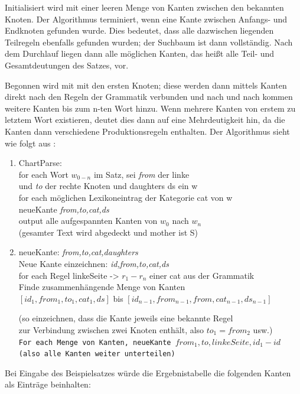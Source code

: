 \documentclass[12pt]{report}
\begin{document}
Initialisiert wird mit einer leeren Menge von Kanten zwischen den bekannten Knoten. Der Algorithmus terminiert, wenn eine Kante zwischen Anfangs- und Endknoten gefunden wurde. Dies bedeutet, dass alle dazwischen liegenden Teilregeln ebenfalls gefunden wurden; der Suchbaum ist dann vollständig. Nach dem Durchlauf liegen dann alle möglichen Kanten, das heißt alle Teil- und Gesamtdeutungen des Satzes, vor. 

Begonnen wird mit mit den ersten Knoten; diese werden dann mittels Kanten direkt nach den Regeln der Grammatik verbunden und nach und nach kommen weitere Kanten bis zum n-ten Wort hinzu. Wenn mehrere Kanten von erstem zu letztem Wort existieren, deutet dies dann auf eine Mehrdeutigkeit hin, da die Kanten dann verschiedene Produktionsregeln enthalten. Der Algorithmus sieht wie folgt aus \cite{cop04}:
\begin{enumerate} \tt
\item 
ChartParse: \\
for each Wort $w_{0-n}$ im Satz, sei \textit{from} der linke \\
und \textit{to} der rechte Knoten und daughters ds ein w \\
\hspace*{.2cm} for each möglichen Lexikoneintrag der Kategorie cat von w \\
\hspace*{.4cm} neueKante \textit{from,to,cat,ds} \\
output alle aufgespannten Kanten von $w_{0}$ nach $w_{n}$ \\ \rm(gesamter Text wird abgedeckt und mother ist S)\tt
\item 
neueKante: \textit{from,to,cat,daughters} \\
Neue Kante einzeichnen: \textit{id,from,to,cat,ds} \\
for each Regel linkeSeite -> $r_{1}-r_{n}$ einer cat aus der Grammatik \\
\hspace*{.2cm} Finde zusammenhängende Menge von Kanten \\
\hspace*{.2cm} $[id_{1},from_{1},to_{1},cat_{1},ds]$ bis $[id_{n-1},from_{n-1},from,cat_{n-1},ds_{n-1}]$ 

\rm(so einzeichnen, dass die Kante jeweils  eine bekannte Regel \\
zur Verbindung zwischen zwei Knoten enthält, also $to_{1}=from_{2}$ usw.)\tt \\
\hspace*{.2cm} For each Menge von Kanten, neueKante $from_{1},to,linkeSeite,id_{1}-id$ \rm(also alle Kanten weiter unterteilen)
\end{enumerate}
Bei Eingabe des Beispielsatzes würde die Ergebnistabelle die folgenden Kanten als Einträge beinhalten:
\end{document}
